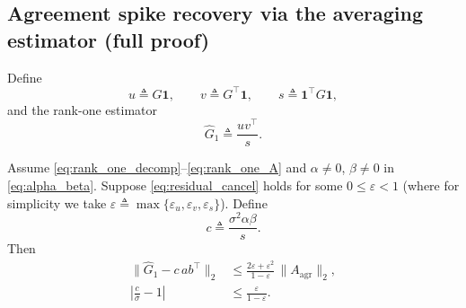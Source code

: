 \subsection{Agreement spike recovery via the averaging estimator (full proof)}
\label{sec:agreement_recovery}

Define
\begin{equation}
\label{eq:uvs_def}
u \triangleq G\mathbf{1},
\qquad
v \triangleq G^\top \mathbf{1},
\qquad
s \triangleq \mathbf{1}^\top G \mathbf{1},
\end{equation}
and the rank-one estimator
\begin{equation}
\label{eq:Ghat1_def}
\widehat{G}_1 \triangleq \frac{u v^\top}{s}.
\end{equation}

\begin{theorem}
\label{thm:rank_one_agreement}
Assume \eqref{eq:rank_one_decomp}--\eqref{eq:rank_one_A} and $\alpha\neq 0$, $\beta\neq 0$ in
\eqref{eq:alpha_beta}. Suppose \eqref{eq:residual_cancel} holds for some $0\le\varepsilon<1$
(where for simplicity we take $\varepsilon\triangleq\max\{\varepsilon_u,\varepsilon_v,\varepsilon_s\}$).
Define
\begin{equation}
\label{eq:c_def}
c \triangleq \frac{\sigma^2 \alpha \beta}{s}.
\end{equation}
Then
\begin{align}
\label{eq:rank_one_bound}
\|\widehat{G}_1 - c\,ab^\top\|_2
&\le
\frac{2\varepsilon+\varepsilon^2}{1-\varepsilon}\,\|A_{\mathrm{agr}}\|_2,
\\[3pt]
\label{eq:scale_bound}
\left|\frac{c}{\sigma}-1\right|
&\le
\frac{\varepsilon}{1-\varepsilon}.
\end{align}
\end{theorem}

